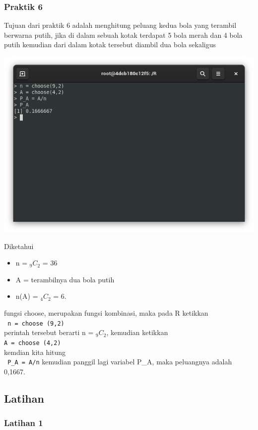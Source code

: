 \documentclass[a4paper,12pt]{article}
\begin{document}
\subsubsection{Praktik 6}
Tujuan dari praktik 6 adalah menghitung peluang kedua bola yang terambil berwarna putih, jika di dalam sebuah kotak terdapat 5 bola merah dan 4 bola putih kemudian dari dalam kotak tersebut diambil dua bola sekaligus
\begin{center}
	\includegraphics[scale=.5]{prak6}
\end{center}
Diketahui 
\begin{itemize}
	\item n = $_{9}C_{2}$ = 36 
	\item A = terambilnya dua bola putih 
	\item n(A) = $_{4}C_{2}$ = 6.
\end{itemize}
fungsi choose, merupakan fungsi kombinasi, maka pada R ketikkan\\
\texttt{ n = choose (9,2)}\\ 
perintah tersebut berarti n = $_{9}C_{2}$, kemudian ketikkan\\
\texttt{A = choose (4,2)}\\
kemdian kita hitung\\
\texttt{ P\_A = A/n}
kemudian panggil lagi variabel P\_A, maka peluangnya adalah 0,1667.

\subsection{Latihan}
\subsubsection{Latihan 1}
\end{document}
